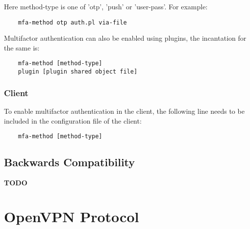 \documentclass[11pt,oneside]{book}
\begin{document}
\noindent Here method-type is one of 'otp', 'push' or 'user-pass'. For example:
\begin{verbatim}
    mfa-method otp auth.pl via-file
\end{verbatim}

\noindent Multifactor authentication can also be enabled using plugins, the incantation for the same is:
\begin{verbatim}
    mfa-method [method-type]
    plugin [plugin shared object file]
\end{verbatim}

\subsection{Client}
To enable multifactor authentication in the client, the following line needs to be included in the
configuration file of the client:

\begin{verbatim}
    mfa-method [method-type]
\end{verbatim}

\section{Backwards Compatibility}
\textbf{TODO}

% 

\appendix
\chapter{OpenVPN Protocol}
\label{OpenVPN:protocol}





\printindex
{}

\begin{verbatim}










\end{verbatim}
\end{document}
